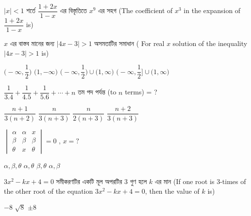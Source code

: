 \documentclass[addpoints]{exam}
\begin{document}
\begin{questions}

\question  $ |x|<1 $ শর্তে $ \dfrac{1+2x}{1-x} $ এর বিস্তৃতিতে $ x^9 $ এর সহগ (The coefficient of $x^3$ in the expansion of $ \dfrac{1+2x}{1-x} $ is) 

\begin{oneparchoices}
\end{oneparchoices}

 \question  $ x $ এর বাস্তব মানের জন্য $ |4x-3|>1 $ অসমতাটির সমাধান  ( For real $ x $ solution of the inequality $ |4x-3|>1 $ is)

\begin{oneparchoices}
\choice $ \Big(-\infty, \dfrac{1}{2}\Big) $
\choice $ \Big(1,-\infty) $
\choice $ \Big(-\infty, \dfrac{1}{2}\Big) \cup \Big(1,\infty\Big)  $
\choice $ \Big(-\infty, \dfrac{1}{2}\Big] \cup \Big(1,\infty\Big)  $

\end{oneparchoices}

\question  $ \dfrac{1}{3.4} + \dfrac{1}{4.5} + \dfrac{1}{5.6} + \cdots +n$ তম পদ পর্যন্ত (to $ n $ terms) = ?

\begin{oneparchoices}
\choice $ \dfrac{n+1}{3(n+2)}$
\choice $ \dfrac{n}{3(n+3)} $
\choice $ \dfrac{n}{2(n+3)} $
\choice  $ \dfrac{n+2}{3(n+3)} $

\end{oneparchoices}

\question  $ \begin{vmatrix}
\alpha & \alpha & x \\
\beta & \beta & \beta \\
\theta & x & \theta
\end{vmatrix} = 0$ , $ x=? $

\begin{oneparchoices}
\choice $ \alpha, \beta, \theta $
\choice $ \alpha, \theta $
\choice $ \beta, \theta $
\choice $ \alpha, \beta $

\end{oneparchoices}

\question  $ 3x^{2}-kx+4=0 $ সমীকরণটির একটি মূল অপরটির 3 গুণ হলে $ k $ এর মান   (If one root is 3-times of the other root of the equation $ 3x^{2}-kx+4=0 $, then the value of $ k $ is)

\begin{oneparchoices}
\choice $ -8 $
\choice $ \sqrt{8} $
\choice $ \pm 8 $

\end{oneparchoices}



\end{questions}
\end{document}
